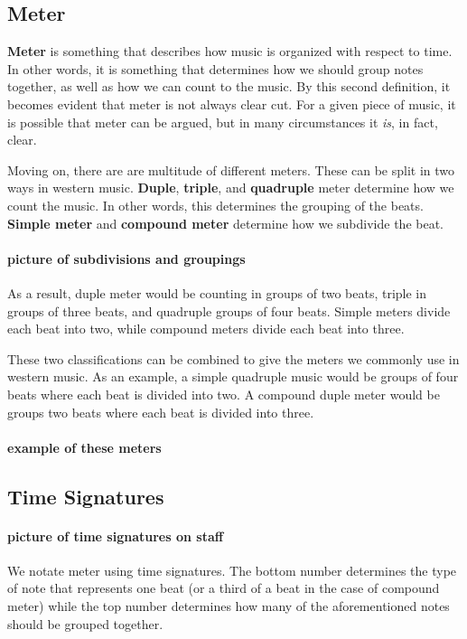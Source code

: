 \documentclass[../OpenAppliedMusicTheory.tex]{subfiles}
\begin{document}
        \subsection{Meter}
        \textbf{Meter} is something that describes how music is organized with respect to time. In other words, it is something that determines how we should group notes together, as well as how we can count to the music. By this second definition, it becomes evident that meter is not always clear cut. For a given piece of music, it is possible that meter can be argued, but in many circumstances it \emph{is}, in fact, clear.

        Moving on, there are are multitude of different meters. These can be split in two ways in western music. \textbf{Duple}, \textbf{triple}, and \textbf{quadruple} meter determine how we count the music. In other words, this determines the grouping of the beats. \textbf{Simple meter} and \textbf{compound meter} determine how we subdivide the beat. 

        \paragraph{picture of subdivisions and groupings}As a result, duple meter would be counting in groups of two beats, triple in groups of three beats, and quadruple groups of four beats. Simple meters divide each beat into two, while compound meters divide each beat into three. 

        These two classifications can be combined to give the meters we commonly use in western music. As an example, a simple quadruple music would be groups of four beats where each beat is divided into two. A compound duple meter would be groups two beats where each beat is divided into three.

        \paragraph{example of these meters}

        \subsection{Time Signatures}
        \paragraph{picture of time signatures on staff}
        We notate meter using time signatures. The bottom number determines the type of note that represents one beat (or a third of a beat in the case of compound meter) while the top number determines how many of the aforementioned notes should be grouped together.
\end{document}
